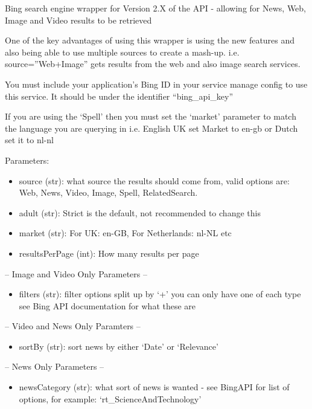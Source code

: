 \documentclass[letterpaper,10pt,english]{sphinxmanual}
\begin{document}
\begin{fulllineitems}
\label{api2.0:puppy.search.engine.BingV2}
Bing search engine wrapper for Version 2.X of the API - allowing for News, Web, Image and Video results to be retrieved

One of the key advantages of using this wrapper is using the new features and also being able to use multiple sources to create a mash-up.
i.e. source=''Web+Image'' gets results from the web and also image search services.

You must include your application's Bing ID in your service manage config to use this service. It should be under the identifier ``bing\_api\_key''

If you are using the `Spell' then you must set the `market' parameter to match the language you are querying in i.e. English UK set Market to en-gb or Dutch set it to nl-nl

Parameters:
\begin{itemize}
\item {} 
source (str): what source the results should come from, valid options are: Web, News, Video, Image, Spell, RelatedSearch.

\item {} 
adult (str):  Strict is the default, not recommended to change this

\item {} 
market (str): For UK: en-GB, For Netherlands: nl-NL etc

\item {} 
resultsPerPage (int): How many results per page

\end{itemize}

-- Image and Video Only Parameters --
\begin{itemize}
\item {} 
filters (str): filter options split up by `+' you can only have one of each type see Bing API documentation for what these are

\end{itemize}

-- Video and News Only Paramters --
\begin{itemize}
\item {} 
sortBy (str): sort news by either `Date' or `Relevance'

\end{itemize}

-- News Only Parameters --
\begin{itemize}
\item {} 
newsCategory (str): what sort of news is wanted - see BingAPI for list of options, for example: `rt\_ScienceAndTechnology'

\end{itemize}

\end{fulllineitems}
\end{document}
